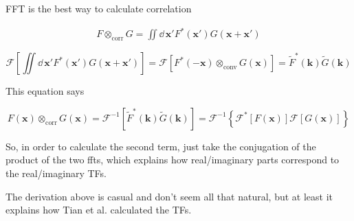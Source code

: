 \documentclass{mynotes}
\begin{document}
FFT is the best way to calculate correlation

\begin{equation}
	\begin{aligned}
		F \otimes_{\text{corr}} G = \iint \dd\,\mathbf{x}' F^*(\mathbf{x}') G(\mathbf{x}+\mathbf{x}')
	\end{aligned}
\end{equation}

\begin{equation}
	\mathscr{F}\left[\iint \dd\,\mathbf{x}' F^*(\mathbf{x}') G(\mathbf{x}+\mathbf{x}')\right]
	=\mathscr{F}\left[F^*(-\mathbf{x}) \otimes_{\text{conv}} G(\mathbf{x})\right]
	=\widetilde{F}^*(\mathbf{k})\widetilde{G}(\mathbf{k})
\end{equation}

This equation says

\begin{equation}
	F(\mathbf{x}) \otimes_{\text{corr}} G(\mathbf{x})
	= \mathscr{F}^{-1}\left[\widetilde{F}^*(\mathbf{k})\widetilde{G}(\mathbf{k})\right]
	= \mathscr{F}^{-1}\left\{\mathscr{F}^*[F(\mathbf{x})]\mathscr{F}[G(\mathbf{x})]\right\}
\end{equation}

So, in order to calculate the second term, just take the conjugation
of the product of the two ffts, which explains how real/imaginary parts
correspond to the real/imaginary TFs.

The derivation above is casual and don't seem all that natural, but
at least it explains how Tian et al. calculated the TFs.
\end{document}
